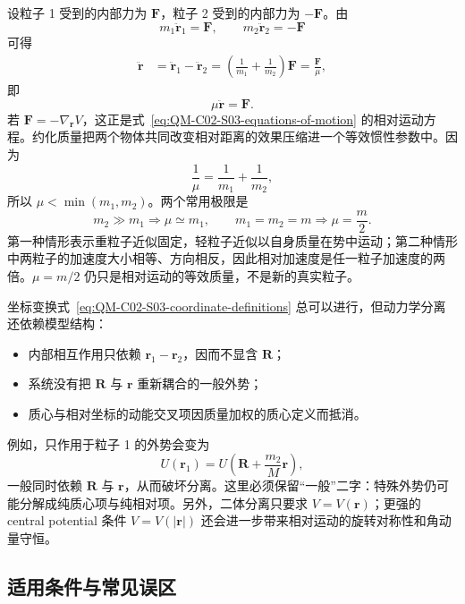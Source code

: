 设粒子 1 受到的内部力为 $\bm F$，粒子 2 受到的内部力为 $-\bm F$。由
\begin{equation}
  m_1\ddot{\bm r}_1=\bm F,
  \qquad
  m_2\ddot{\bm r}_2=-\bm F
  \label{eq:QM-C02-S03-newton-pair}
\end{equation}
可得
\begin{align}
  \ddot{\bm r}
  &=\ddot{\bm r}_1-\ddot{\bm r}_2
    =\left(\frac1{m_1}+\frac1{m_2}\right)\bm F
    =\frac{\bm F}{\mu},
\end{align}
即
\begin{equation}
  \boxed{\mu\ddot{\bm r}=\bm F.}
  \label{eq:QM-C02-S03-newton-reduced-mass}
\end{equation}
若 $\bm F=-\nabla_{\bm r}V$，这正是式~\eqref{eq:QM-C02-S03-equations-of-motion} 的相对运动方程。约化质量把两个物体共同改变相对距离的效果压缩进一个等效惯性参数中。因为
\[
  \frac1\mu=\frac1{m_1}+\frac1{m_2},
\]
所以 $\mu<\min(m_1,m_2)$。两个常用极限是
\begin{equation}
  m_2\gg m_1\Longrightarrow\mu\simeq m_1,
  \qquad
  m_1=m_2=m\Longrightarrow\mu=\frac m2.
  \label{eq:QM-C02-S03-reduced-mass-limits}
\end{equation}
第一种情形表示重粒子近似固定，轻粒子近似以自身质量在势中运动；第二种情形中两粒子的加速度大小相等、方向相反，因此相对加速度是任一粒子加速度的两倍。$\mu=m/2$ 仍只是相对运动的等效质量，不是新的真实粒子。


坐标变换式~\eqref{eq:QM-C02-S03-coordinate-definitions} 总可以进行，但动力学分离还依赖模型结构：
\begin{itemize}[leftmargin=*]
  \item 内部相互作用只依赖 $\bm r_1-\bm r_2$，因而不显含 $\bm R$；
  \item 系统没有把 $\bm R$ 与 $\bm r$ 重新耦合的一般外势；
  \item 质心与相对坐标的动能交叉项因质量加权的质心定义而抵消。
\end{itemize}
例如，只作用于粒子 1 的外势会变为
\begin{equation}
  U(\bm r_1)
  =U\left(\bm R+\frac{m_2}{M}\bm r\right),
  \label{eq:QM-C02-S03-external-potential}
\end{equation}
一般同时依赖 $\bm R$ 与 $\bm r$，从而破坏分离。这里必须保留“一般”二字：特殊外势仍可能分解成纯质心项与纯相对项。另外，二体分离只要求 $V=V(\bm r)$；更强的 central potential 条件 $V=V(|\bm r|)$ 还会进一步带来相对运动的旋转对称性和角动量守恒。

\subsection{适用条件与常见误区}

